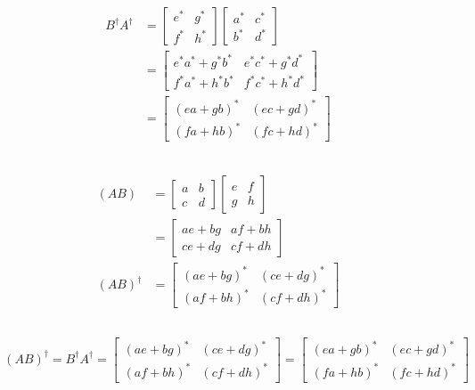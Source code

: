 \documentclass{article}
\begin{document}
\begin{align*}
\begin{split}
    B^{\dagger}A^{\dagger} &= \begin{bmatrix} e^* & g^* \\ f^* & h^* \end{bmatrix}\begin{bmatrix} a^* & c^* \\ b^* & d^* \end{bmatrix} \\
    &= \begin{bmatrix} e^* a^* + g^* b^* & e^* c^* + g^* d^* \\ f^* a^* + h^* b^* & f^* c^* + h^* d^* \end{bmatrix} \\
    &= \begin{bmatrix} (ea + gb)^* & (ec + gd)^* \\ (fa + hb)^* & (fc + hd)^* \end{bmatrix} \\\\
\end{split}
\end{align*}


\begin{align*}
\begin{split}
   (AB) &= \begin{bmatrix} a & b \\ c & d \end{bmatrix} \begin{bmatrix} e & f \\ g & h \end{bmatrix} \\
   &= \begin{bmatrix} ae + bg & af + bh \\ ce + dg & cf + dh \end{bmatrix} \\
   (AB)^{\dagger} &= \begin{bmatrix} (ae + bg)^* & (ce + dg)^* \\ (af + bh)^* & (cf + dh)^* \end{bmatrix} \\
\end{split}
\end{align*}

\begin{align*}
    \begin{split}
        (AB)^{\dagger} = B^{\dagger}A^{\dagger} = \begin{bmatrix} (ae + bg)^* & (ce + dg)^* \\ (af + bh)^* & (cf + dh)^* \end{bmatrix} = \begin{bmatrix} (ea + gb)^* & (ec + gd)^* \\ (fa + hb)^* & (fc + hd)^* \end{bmatrix} \\\\
    \end{split}
\end{align*}
\end{document}
